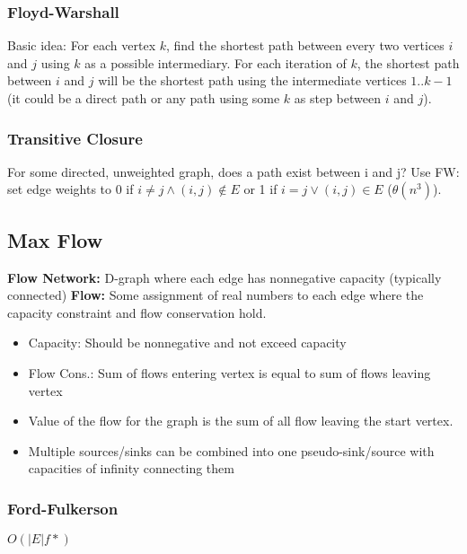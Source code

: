 \documentclass[7pt]{article}
\begin{document}
\begin{multicols*}{4}
\subsubsection*{Floyd-Warshall}
Basic idea: For each vertex $k$, find the shortest path between every
two vertices $i$ and $j$ using $k$ as a possible intermediary.  For
each iteration of $k$, the shortest path between $i$ and $j$ will be
the shortest path using the intermediate vertices $1..k-1$ (it could
be a direct path or any path using some $k$ as step between $i$ and
$j$).  

\subsubsection*{Transitive Closure}
For some directed, unweighted graph, does a path exist between i and
j?  Use FW: set edge weights to 0 if $i \neq j \wedge (i,j) \not\in E$ or
1 if $i = j \vee (i,j) \in E$ ($\theta(n^3)$).

\subsection*{Max Flow}
{\bf Flow Network:} D-graph where each edge has nonnegative capacity
(typically connected)
{\bf Flow:} Some assignment of real numbers to each edge where the
capacity constraint and flow conservation hold.


\begin{itemize}
\item Capacity: Should be nonnegative and not exceed capacity
\item Flow Cons.: Sum of flows entering vertex is equal to sum of flows
leaving vertex
\item Value of the flow for the graph is the sum of all flow leaving the
start vertex.
\item Multiple sources/sinks can be combined into one
  pseudo-sink/source with capacities of infinity connecting them
\end{itemize}

\subsubsection*{Ford-Fulkerson}
$O(|E|f*)$


\end{multicols*}
\end{document}
